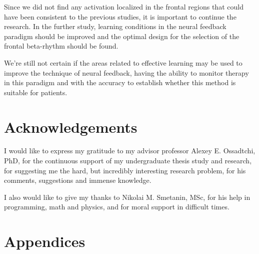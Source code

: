 \documentclass[14pt,a4paper]{scrartcl}
\begin{document}
Since we did not find any activation localized in the frontal regions that could have been consistent to the previous studies, it is important to continue the research. In the further study, learning conditions in the neural feedback paradigm should be improved and the optimal design for the selection of the frontal beta-rhythm should be found.

We’re still not certain if the areas related to effective learning may be used to improve the technique of neural feedback, having the ability to monitor therapy in this paradigm and with the accuracy to establish whether this method is suitable for patients.

\newpage
\section*{Acknowledgements}
\label{sec:Acknowledgements}

I would like to express my gratitude to my advisor professor Alexey E. Ossadtchi, PhD, for the continuous support of my undergraduate thesis study and research, for suggesting me the hard, but incredibly interesting research problem, for his comments, suggestions and immense knowledge.

I also would like to give my thanks to Nikolai M. Smetanin, MSc, for his help in programming, math and physics, and for moral support in difficult times. 

\newpage
\section*{Appendices}
\label{sec:Appendices}

\newpage


\end{document}
